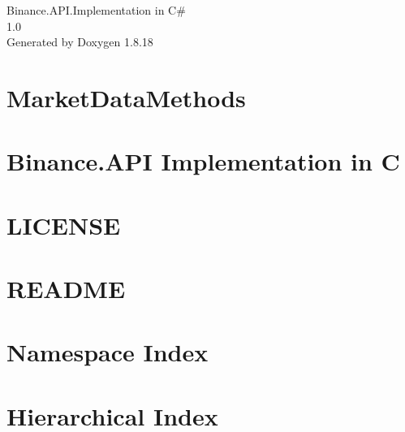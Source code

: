 \let\mypdfximage\pdfximage\def\pdfximage{\immediate\mypdfximage}\documentclass[twoside]{book}
\newcommand{\+}{\discretionary{\mbox{\scriptsize$\hookleftarrow$}}{}{}}
\newcommand{\clearemptydoublepage}{%
  \newpage{\pagestyle{empty}\cleardoublepage}%
}
\begin{document}
\hypersetup{pageanchor=false,
             bookmarksnumbered=true,
             pdfencoding=unicode
            }
\begin{titlepage}
\vspace*{7cm}
\begin{center}%
{\Large Binance.\+A\+P\+I.\+Implementation in C\# \\[1ex]\large 1.\+0 }\\
\vspace*{1cm}
{\large Generated by Doxygen 1.8.18}\\
\end{center}
\end{titlepage}
\clearemptydoublepage
{}
\tableofcontents
\clearemptydoublepage
{}
\hypersetup{pageanchor=true}

\chapter{Market\+Data\+Methods}
\label{md__documentation__market_data_methods}

\chapter{Binance.\+A\+PI Implementation in C}
\label{md__documentation__project}

\chapter{L\+I\+C\+E\+N\+SE}
\label{md_packages__newtonsoft_8_json_813_80_81__l_i_c_e_n_s_e}

\chapter{R\+E\+A\+D\+ME}
\label{md__r_e_a_d_m_e}

\chapter{Namespace Index}

\chapter{Hierarchical Index}

\end{document}

